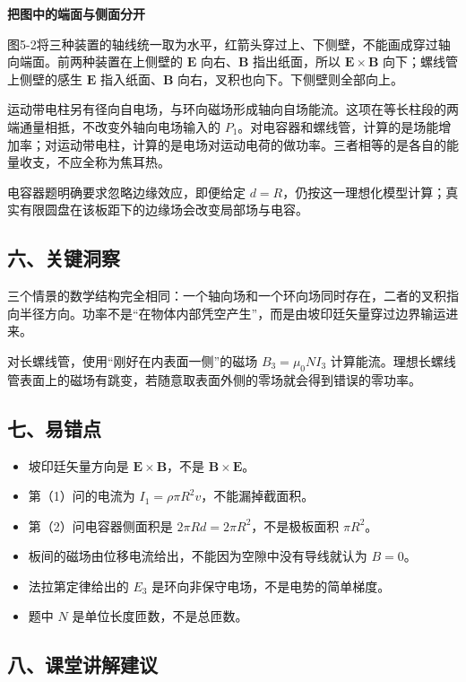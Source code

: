 \documentclass[12pt,a4paper,UTF8]{ctexart}
\newcommand{\tightlist}{\setlength{\itemsep}{0pt}\setlength{\parskip}{0pt}}
\begin{document}
\textbf{把图中的端面与侧面分开}

图5-2将三种装置的轴线统一取为水平，红箭头穿过上、下侧壁，不能画成穿过轴向端面。前两种装置在上侧壁的
\(\bm E\) 向右、\(\bm B\) 指出纸面，所以 \(\bm E\times\bm B\)
向下；螺线管上侧壁的感生 \(\bm E\) 指入纸面、\(\bm B\)
向右，叉积也向下。下侧壁则全部向上。

运动带电柱另有径向自电场，与环向磁场形成轴向自场能流。这项在等长柱段的两端通量相抵，不改变外轴向电场输入的
\(P_1\)。对电容器和螺线管，计算的是场能增加率；对运动带电柱，计算的是电场对运动电荷的做功率。三者相等的是各自的能量收支，不应全称为焦耳热。

电容器题明确要求忽略边缘效应，即便给定
\(d=R\)，仍按这一理想化模型计算；真实有限圆盘在该板距下的边缘场会改变局部场与电容。

\subsection{六、关键洞察}\label{ux516dux5173ux952eux6d1eux5bdf-4}

三个情景的数学结构完全相同：一个轴向场和一个环向场同时存在，二者的叉积指向半径方向。功率不是``在物体内部凭空产生''，而是由坡印廷矢量穿过边界输运进来。

对长螺线管，使用``刚好在内表面一侧''的磁场 \(B_3=\mu_0NI_3\)
计算能流。理想长螺线管表面上的磁场有跳变，若随意取表面外侧的零场就会得到错误的零功率。

\subsection{七、易错点}\label{ux4e03ux6613ux9519ux70b9-4}

\begin{itemize}
\tightlist
\item
  坡印廷矢量方向是 \(\bm E\times\bm B\)，不是 \(\bm B\times\bm E\)。
\item
  第（1）问的电流为 \(I_1=\rho\pi R^2v\)，不能漏掉截面积。
\item
  第（2）问电容器侧面积是 \(2\pi Rd=2\pi R^2\)，不是极板面积
  \(\pi R^2\)。
\item
  板间的磁场由位移电流给出，不能因为空隙中没有导线就认为 \(B=0\)。
\item
  法拉第定律给出的 \(E_3\) 是环向非保守电场，不是电势的简单梯度。
\item
  题中 \(N\) 是单位长度匝数，不是总匝数。
\end{itemize}

\subsection{八、课堂讲解建议}\label{ux516bux8bfeux5802ux8bb2ux89e3ux5efaux8bae-4}
\end{document}
